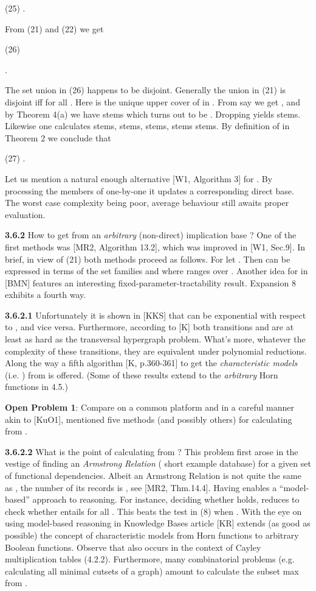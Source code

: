 \documentclass[11pt]{article}
\begin{document}
(25) \quad .

From (21) and (22) we get

(26) \quad  

\hspace*{2.2cm} .

The set union in (26) happens to be disjoint. Generally the union in (21) is disjoint iff  for all . Here  is the unique upper cover of  in . From say  we get , and by Theorem 4(a) we have stems which turns out to be . Dropping  yields stems. Likewise one calculates stems, stems, stems, stems stems. By definition of  in Theorem 2 we conclude that

(27) \quad .

Let us mention a natural enough alternative [W1, Algorithm 3] for . 
By processing the members of  one-by-one it updates a corresponding direct base. The worst case complexity being poor, average behaviour still awaits proper evaluation.

{\bf 3.6.2}  How to get  from an {\it arbitrary} (non-direct) implication base ?  One of the first methods was [MR2, Algorithm 13.2], which was improved in [W1, Sec.9]. 
In brief, in view of (21) both methods proceed as follows. For  let . Then  can be expressed in terms of the set families  and  where  ranges over . Another idea for  in [BMN] features an interesting fixed-parameter-tractability result.
Expansion 8 exhibits a fourth way.

{\bf 3.6.2.1} Unfortunately it is shown in [KKS] that  can be exponential with respect to , and vice versa. Furthermore, according to [K] both transitions  and  are at least as hard as the transversal hypergraph problem. What's more, whatever the complexity of these transitions, they are equivalent under polynomial reductions. 
Along the way a fifth algorithm [K, p.360-361] to get the {\it characteristic models} (i.e. ) from  is offered. (Some of these results extend to the {\it arbitrary} Horn functions in  4.5.)

{\bf Open Problem 1}: Compare on a common platform and in a careful manner akin to [KuO1], mentioned five methods (and possibly others) for calculating  from .


{\bf 3.6.2.2} What is the point of calculating  from ? This problem first arose in the vestige of finding an {\it Armstrong Relation} ( short example database) for a given set of functional dependencies. Albeit an Armstrong Relation is not quite the same as , the number of its records is , see [MR2, Thm.14.4]. Having  enables a ``model-based'' approach to reasoning. For instance, deciding whether  holds, reduces to check whether  entails  for all . This beats the test in (8) when . With the eye on using model-based reasoning in Knowledge Bases article [KR] extends (as good as possible) the concept of characteristic models from Horn functions to arbitrary Boolean functions. Observe that  also occurs in the context of Cayley multiplication tables (4.2.2). Furthermore, many combinatorial problems (e.g. calculating all minimal cutsets of a graph) amount to calculate the subset max from .
\end{document}
